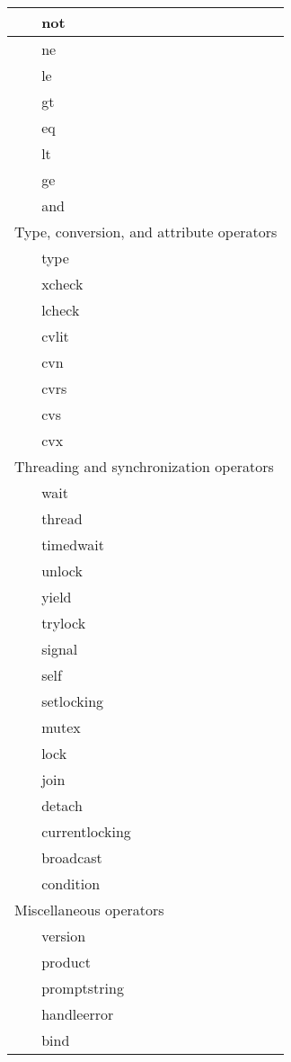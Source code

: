 \begin{longtable}{|r|l|l|p{4in}|}
\hline
& not & & \\
\hline
& ne & & \\
\hline
& le & & \\
\hline
& gt & & \\
\hline
& eq & & \\
\hline
& lt & & \\
\hline
& ge & & \\
\hline
& and & & \\
\hline \hline
\multicolumn{4}{|l|}{Type, conversion, and attribute operators} \\
\hline \hline
& type & & \\
\hline
& xcheck & & \\
\hline
& lcheck & & \\
\hline
& cvlit & & \\
\hline
& cvn & & \\
\hline
& cvrs & & \\
\hline
& cvs & & \\
\hline
& cvx & & \\
\hline \hline
\multicolumn{4}{|l|}{Threading and synchronization operators} \\
\hline \hline
& wait & & \\
\hline
& thread & & \\
\hline
& timedwait & & \\
\hline
& unlock & & \\
\hline
& yield & & \\
\hline
& trylock & & \\
\hline
& signal & & \\
\hline
& self & & \\
\hline
& setlocking & & \\
\hline
& mutex & & \\
\hline
& lock & & \\
\hline
& join & & \\
\hline
& detach & & \\
\hline
& currentlocking & & \\
\hline
& broadcast & & \\
\hline
& condition & & \\
\hline \hline
\multicolumn{4}{|l|}{Miscellaneous operators} \\
\hline \hline
& version & & \\
\hline
& product & & \\
\hline
& promptstring & & \\
\hline
& handleerror & & \\
\hline
& bind & & \\
\end{longtable}

